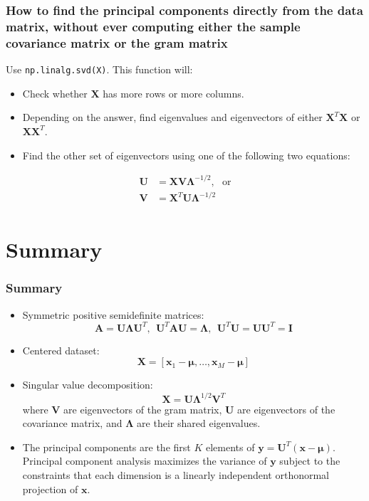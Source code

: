 \documentclass{beamer}
\begin{document}
\begin{frame}
  \frametitle{How to find the principal components directly from the data matrix, without ever computing either the sample covariance matrix or the gram matrix}

  Use {\tt np.linalg.svd(X)}.  This function will:
  \begin{itemize}
  \item Check whether $\mathbf{X}$ has more rows or more columns.
  \item Depending on the answer, find eigenvalues and eigenvectors of
    either $\mathbf{X}^T\mathbf{X}$ or $\mathbf{X}\mathbf{X}^T$.
  \item Find the other set of eigenvectors using one of the following two equations:
  \end{itemize}
  \begin{align*}
    \mathbf{U}&=\mathbf{X}\mathbf{V}\bm{\Lambda}^{-1/2},~~~\text{or}\\
    \mathbf{V}&=\mathbf{X}^T\mathbf{U}\bm{\Lambda}^{-1/2}\\
  \end{align*}
\end{frame}

\section[Summary]{Summary}
\setcounter{subsection}{1}

\begin{frame}
  \frametitle{Summary}
  \begin{itemize}
  \item Symmetric positive semidefinite matrices:
    \[
    \mathbf{A}=\mathbf{U}\bm{\Lambda} \mathbf{U}^T,~~\mathbf{U}^T\mathbf{A}\mathbf{U}=\bm{\Lambda},~~\mathbf{U}^T\mathbf{U}=\mathbf{U}\mathbf{U}^T=\mathbf{I}
    \]
  \item Centered dataset:
    \[
    \mathbf{X} = \left[\mathbf{x}_1-\bm{\mu},\ldots,\mathbf{x}_{M}-\bm{\mu}\right]
    \]
  \item Singular value decomposition:
    \[
    \mathbf{X} = \mathbf{U}\bm{\Lambda}^{1/2}\mathbf{V}^T
    \]
    where $\mathbf{V}$ are eigenvectors of the gram matrix,
    $\mathbf{U}$ are eigenvectors of the covariance matrix, and
    $\bm{\Lambda}$ are their shared eigenvalues.
  \item The principal components are the first $K$ elements of
    $\mathbf{y}=\mathbf{U}^T(\mathbf{x}-\bm{\mu})$.  Principal
    component analysis maximizes the variance of $\mathbf{y}$ subject
    to the constraints that each dimension is a linearly independent
    orthonormal projection of $\mathbf{x}$.
  \end{itemize}
\end{frame}
\end{document}
